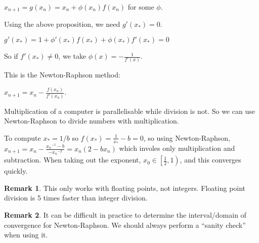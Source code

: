 \documentclass[12pt,a4paper]{article}
\theoremstyle{definition}
\newtheorem*{remark}{Remark}
\begin{document}
$x_{n + 1} = g(x_n) = x_n + \phi (x_n) f(x_n)$ for some $\phi$.

Using the above proposition, we need $g'(x_*) = 0$.

$g'(x_*) = 1 + \phi'(x_*)f(x_*) + \phi(x_*)f'(x_*) = 0$

So if $f'(x_*) \ne 0$, we take $\phi(x) = -\frac{1}{f'(x)}$.

This is the Newton-Raphson method:

$x_{n + 1} = x_n - \frac{f(x_n)}{f'(x_n)}$.

Multiplication of a computer is parallelisable while division is not. So we can use Newton-Raphson to divide numbers with multiplication.

To compute $x_* = 1 / b$ so $f(x_*) = \frac{1}{x_*} - b = 0$, so using Newton-Raphson, $x_{n + 1} = x_n - \frac{{x_n}^{-1} - b}{-{x_n}^{-2}} = x_n (2 - b x_n)$ which involes only multiplication and subtraction. When taking out the exponent, $x_0 \in \left[ \frac{1}{2}, 1 \right)$, and this converges quickly.

\begin{remark}
	This only works with floating points, not integers. Floating point division is 5 times faster than integer division.
\end{remark}

\begin{remark}
	It can be difficult in practice to determine the interval/domain of convergence for Newton-Raphson. We should always perform a ``sanity check'' when using it.
\end{remark}
\end{document}
